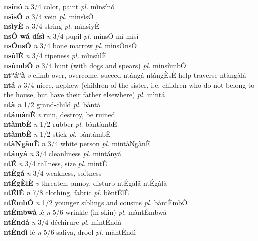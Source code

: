 \documentclass{article}
\begin{document}
{\bf nsínó}  {\it n} 3/4 color, paint {\it pl.} mìnsínó         \\ 
{\bf nsìsÓ}  {\it n} 3/4 vein {\it pl.} mìnsìsÓ         \\ 
{\bf nsìyÈ}  {\it n} 3/4 string {\it pl.} mìnsìyÈ         \\ 
{\bf nsÔ wá dísì}  {\it n} 3/4 pupil {\it pl.} mìnsÔ mí mísì         \\ 
{\bf nsÓnsÓ}  {\it n} 3/4 bone marrow {\it pl.} mìnsÓnsÓ         \\ 
{\bf nsùlÈ}  {\it n} 3/4 ripeness {\it pl.} mìnsùlÈ         \\ 
{\bf nsùmbÓ}  {\it n} 3/4 hunt (with dogs and spears) {\it pl.} mìnsùmbÓ         \\ 
{\bf nt°á°à}  {\it v} climb over, overcome, suceed   ntàngá  ntàngÈsÈ help traverse ntàngàlà   \\ 
{\bf ntá}  {\it n} 3/4 niece, nephew (children of the sister, i.e. children who do not belong to the house, but have their father elsewhere) {\it pl.} mìntá         \\ 
{\bf ntà}  {\it n} 1/2 grand-child {\it pl.} bàntà         \\ 
{\bf ntámànÈ}  {\it v} ruin, destroy, be ruined         \\ 
{\bf ntàmbÈ}  {\it n} 1/2 rubber {\it pl.} bàntàmbÈ         \\ 
{\bf ntàmbÊ}  {\it n} 1/2 stick {\it pl.} bàntàmbÊ         \\ 
{\bf ntàNgànÈ}  {\it n} 3/4 white person {\it pl.} mìntàNgànÈ         \\ 
{\bf ntányá}  {\it n} 3/4 cleanliness {\it pl.} mìntányá         \\ 
{\bf ntÉ}  {\it n} 3/4 tallness, size {\it pl.} mìntÉ         \\ 
{\bf ntÈgá}  {\it n} 3/4 weakness, softness         \\ 
{\bf ntÉgÈlÈ}  {\it v} threaten, annoy, disturb   ntÉgálâ   ntÉgàlà   \\ 
{\bf ntÉlÉ}  {\it n} 7/8 clothing, fabric {\it pl.} bèntÉlÉ         \\ 
{\bf ntÈmbÓ}  {\it n} 1/2 younger siblings and cousins {\it pl.} bàntÈmbÓ         \\ 
{\bf ntÈmbwà} lè {\it n} 5/6 wrinkle (in skin) {\it pl.} màntÉmbwá         \\ 
{\bf ntÈndá}  {\it n} 3/4 déchirure {\it pl.} mìntÈndá         \\ 
{\bf ntÈndì} lè {\it n} 5/6 saliva, drool {\it pl.} màntÈndì         \\ 
\end{document}
